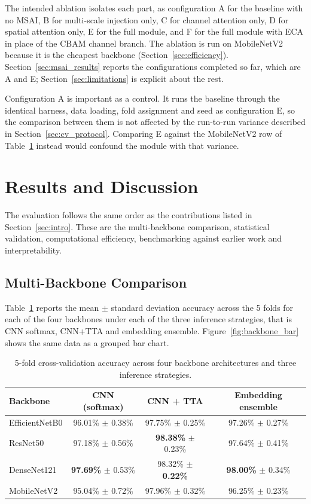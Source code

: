 \documentclass[11pt]{article}
\begin{document}
The intended ablation isolates each part, as configuration A for the baseline with no MSAI, B for multi-scale injection only, C for channel attention only, D for spatial attention only, E for the full module, and F for the full module with ECA \cite{wang2020eca} in place of the CBAM channel branch. The ablation is run on MobileNetV2 because it is the cheapest backbone (Section~\ref{sec:efficiency}). Section~\ref{sec:msai_results} reports the configurations completed so far, which are A and E; Section~\ref{sec:limitations} is explicit about the rest.

Configuration A is important as a control. It runs the baseline through the identical harness, data loading, fold assignment and seed as configuration E, so the comparison between them is not affected by the run-to-run variance described in Section~\ref{sec:cv_protocol}. Comparing E against the MobileNetV2 row of Table~\ref{tab:backbone_results} instead would confound the module with that variance.

\section{Results and Discussion}
\label{sec:results}

The evaluation follows the same order as the contributions listed in Section~\ref{sec:intro}. These are the multi-backbone comparison, statistical validation, computational efficiency, benchmarking against earlier work and interpretability.

\subsection{Multi-Backbone Comparison}
\label{sec:backbone_results}

Table~\ref{tab:backbone_results} reports the mean $\pm$ standard deviation accuracy across the 5 folds for each of the four backbones under each of the three inference strategies, that is CNN softmax, CNN+TTA and embedding ensemble. Figure~\ref{fig:backbone_bar} shows the same data as a grouped bar chart.

\begin{table}[htbp]
\centering
\caption{5-fold cross-validation accuracy across four backbone architectures and three inference strategies.}
\label{tab:backbone_results}
\small
\begin{tabular*}{\textwidth}{@{\extracolsep{\fill}}lccc@{}}
\toprule
\textbf{Backbone} & \textbf{CNN (softmax)} & \textbf{CNN + TTA} & \textbf{Embedding ensemble} \\
\midrule
EfficientNetB0 & 96.01\% $\pm$ 0.38\% & 97.75\% $\pm$ 0.25\% & 97.26\% $\pm$ 0.27\% \\
ResNet50       & 97.18\% $\pm$ 0.56\% & \textbf{98.38\%} $\pm$ 0.23\% & 97.64\% $\pm$ 0.41\% \\
DenseNet121    & \textbf{97.69\%} $\pm$ 0.53\% & 98.32\% $\pm$ \textbf{0.22\%} & \textbf{98.00\%} $\pm$ 0.34\% \\
MobileNetV2    & 95.04\% $\pm$ 0.72\% & 97.96\% $\pm$ 0.32\% & 96.25\% $\pm$ 0.23\% \\
\bottomrule
\end{tabular*}
\end{table}
\end{document}
